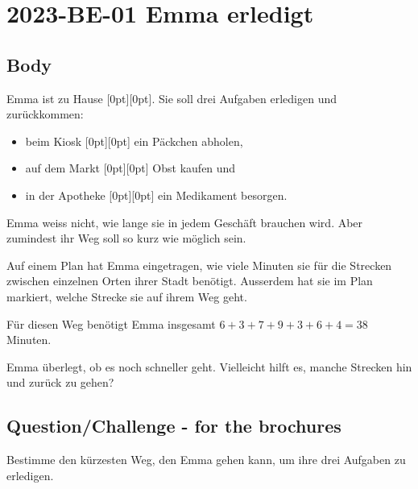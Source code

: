 \documentclass[a4paper,11pt]{report}
\newcommand{\taskGraphicsFolder}{..}
\begin{document}
\section*{\centering{} 2023-BE-01 Emma erledigt}


\subsection*{Body}

Emma ist zu Hause \raisebox{\dimexpr -0.5ex -0.2ex \relax}[0pt][0pt]{}.  Sie soll drei Aufgaben erledigen
und zurückkommen:

\begin{itemize}
  \item beim Kiosk \raisebox{\dimexpr -0.5ex -0.2ex \relax}[0pt][0pt]{} ein Päckchen abholen,
  \item auf dem Markt \raisebox{\dimexpr -0.5ex -0.2ex \relax}[0pt][0pt]{} Obst kaufen und
  \item in der Apotheke \raisebox{\dimexpr -0.5ex -0.2ex \relax}[0pt][0pt]{} ein Medikament besorgen.
\end{itemize}

Emma weiss nicht, wie lange sie in jedem Geschäft brauchen wird.
Aber zumindest ihr Weg soll so kurz wie möglich sein.

Auf einem Plan hat Emma eingetragen, wie viele Minuten sie für die
Strecken zwischen einzelnen Orten ihrer Stadt benötigt.
Ausserdem hat sie im Plan markiert, welche Strecke sie auf ihrem Weg geht.

Für diesen Weg benötigt Emma insgesamt ${6 + 3 + 7 + 9 + 3 + 6 + 4 = 38}$ Minuten.

{\centering%
\par}

Emma überlegt, ob es noch schneller geht.
Vielleicht hilft es, manche Strecken hin und zurück zu gehen?

{\em


\subsection*{Question/Challenge - for the brochures}

Bestimme den kürzesten Weg, den Emma gehen kann, um ihre drei Aufgaben zu erledigen.

{\centering%
\par}

}
\end{document}
